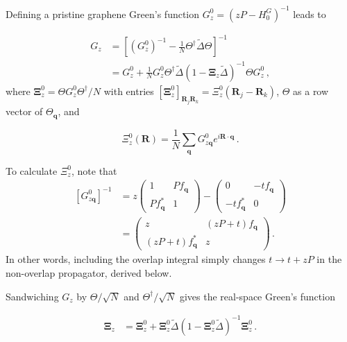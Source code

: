 \documentclass[aps, prb, superscriptaddress, preprint, floatfix]{revtex4-1}
\begin{document}
Defining a pristine graphene Green's function $G_{z}^0 = \left(zP - H^G_0\right)^{-1}$ leads to

%
\begin{align}
	G_{z} &= \left[\left(G_{z}^0\right)^{-1} - \frac{1}{N} \Theta^\dagger \tilde{\Delta}  \Theta\right]^{-1}
	\nonumber
	\\
	&=
	G_{z}^0
	+
	\frac{1}{N} G_{z}^0\Theta^\dagger \tilde{\Delta}
	\left( 1
	-
	 \boldsymbol{\Xi}_{z} \tilde{\Delta}
	\right)^{-1} \Theta G_{z}^0\,,	
\end{align}
%
where $\boldsymbol{\Xi}^0_{z} = \Theta G_{z}^0\Theta^\dagger / N$ with entries $\left[\boldsymbol{\Xi}^0_{z}\right]_{\mathbf{R}_j\mathbf{R}_k} = \Xi_{z}^0\left(\mathbf{R}_j - \mathbf{R}_k\right)$, $\Theta$ as a row vector of $\Theta_\mathbf{q}$, and

%
\begin{equation}
    \Xi_z^0\left(\mathbf{R}\right) = \frac{1}{N}\sum_\mathbf{q}G_{z\mathbf{q}}^0
    e^{i \mathbf{R} \cdot\mathbf{q}}\,.
    \label{eqn:Xi}
\end{equation}
%

To calculate $\Xi_z^0$, note that
%
\begin{align}
   \left[ G_{z\mathbf{q}}^0\right]^{-1} &= 
   z\begin{pmatrix}
       1&P f_\mathbf{q}
       \\
       P f_\mathbf{q}^*&1
   \end{pmatrix} - 
   \begin{pmatrix}
       0&-tf_\mathbf{q}
       \\
       -tf_\mathbf{q}^*&0
   \end{pmatrix} 
   \nonumber
   \\
   &= 
   \begin{pmatrix}
       z&(zP+t) f_\mathbf{q}
       \\
       (zP+t) f_\mathbf{q}^*&z
   \end{pmatrix}\,.
\end{align}
%
In other words, including the overlap integral simply changes $t \rightarrow t + zP$ in the non-overlap propagator, derived below.

Sandwiching $G_z$ by $\Theta/\sqrt{N}$ and $\Theta^\dagger/\sqrt{N}$ gives the real-space Green's function

%
\begin{align}
	\boldsymbol{\Xi}_{z} &= 
		\boldsymbol{\Xi}_{z}^0
	+
		\boldsymbol{\Xi}_{z}^0 \tilde{\Delta}
	\left( 1
	-
	 \boldsymbol{\Xi}_{z}^0 \tilde{\Delta}
	\right)^{-1} \boldsymbol{\Xi}_{z}^0\,.	
\end{align}
%
\end{document}
